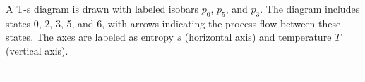 A T-s diagram is drawn with labeled isobars \( p_0 \), \( p_5 \), and \( p_3 \). The diagram includes states 0, 2, 3, 5, and 6, with arrows indicating the process flow between these states. The axes are labeled as entropy \( s \) (horizontal axis) and temperature \( T \) (vertical axis).

---